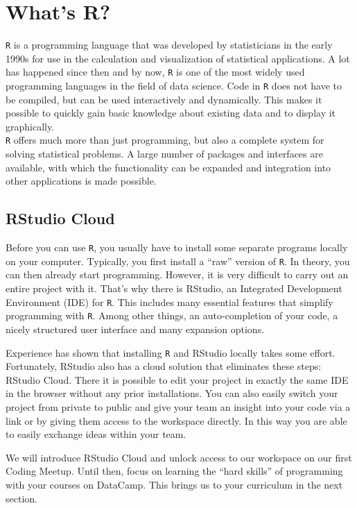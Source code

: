 \documentclass[
  11pt,
]{book}
\begin{document}
\hypertarget{whats-r}{%
\section{What's R?}\label{whats-r}}

\texttt{R} is a programming language that was developed by statisticians
in the early 1990s for use in the calculation and visualization of
statistical applications. A lot has happened since then and by now,
\texttt{R} is one of the most widely used programming languages in the
field of data science. Code in \texttt{R} does not have to be compiled,
but can be used interactively and dynamically. This makes it possible to
quickly gain basic knowledge about existing data and to display it
graphically.\\
\texttt{R} offers much more than just programming, but also a complete
system for solving statistical problems. A large number of packages and
interfaces are available, with which the functionality can be expanded
and integration into other applications is made possible.

\hypertarget{rstudio-cloud}{%
\subsection{RStudio Cloud}\label{rstudio-cloud}}

Before you can use \texttt{R}, you usually have to install some separate
programs locally on your computer. Typically, you first install a
``raw'' version of \texttt{R}. In theory, you can then already start
programming. However, it is very difficult to carry out an entire
project with it. That's why there is RStudio, an Integrated Development
Environment (IDE) for \texttt{R}. This includes many essential features
that simplify programming with \texttt{R}. Among other things, an
auto-completion of your code, a nicely structured user interface and
many expansion options.

Experience has shown that installing \texttt{R} and RStudio locally
takes some effort. Fortunately, RStudio also has a cloud solution that
eliminates these steps: RStudio Cloud. There it is possible to edit your
project in exactly the same IDE in the browser without any prior
installations. You can also easily switch your project from private to
public and give your team an insight into your code via a link or by
giving them access to the workspace directly. In this way you are able
to easily exchange ideas within your team.

We will introduce RStudio Cloud and unlock access to our workspace on
our first Coding Meetup. Until then, focus on learning the ``hard
skills'' of programming with your courses on DataCamp. This brings us to
your curriculum in the next section.
\end{document}
